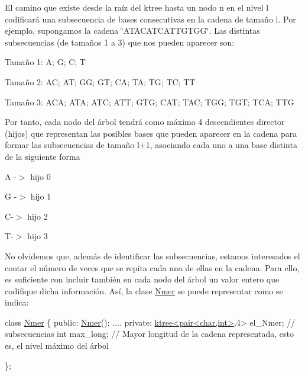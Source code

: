 El camino que existe desde la raíz del ktree hasta un nodo n en el nivel l codificará una subsecuencia de bases consecutivas en la cadena de tamaño l. Por ejemplo, supongamos la cadena \char`\"{}\+A\+T\+A\+C\+A\+T\+C\+A\+T\+T\+G\+T\+G\+G\char`\"{}. Las distintas subsecuencias (de tamaños 1 a 3) que nos pueden aparecer son\+:

\begin{DoxyItemize}
\item Tamaño 1\+: A; G; C; T \item Tamaño 2\+: AC; AT; GG; GT; CA; TA; TG; TC; TT \item Tamaño 3\+: A\+CA; A\+TA; A\+TC; A\+TT; G\+TG; C\+AT; T\+AC; T\+GG; T\+GT; T\+CA; T\+TG\end{DoxyItemize}
Por tanto, cada nodo del árbol tendrá como máximo 4 descendientes director (hijos) que representan las posibles bases que pueden aparecer en la cadena para formar las subsecuencias de tamaño l+1, asociando cada uno a una base distinta de la siguiente forma

\begin{DoxyItemize}
\item A -\/$>$ hijo 0\end{DoxyItemize}
\begin{DoxyItemize}
\item G -\/$>$ hijo 1\end{DoxyItemize}
\begin{DoxyItemize}
\item C-\/$>$ hijo 2\end{DoxyItemize}
\begin{DoxyItemize}
\item T-\/$>$ hijo 3\end{DoxyItemize}
No olvidemos que, además de identificar las subsecuencias, estamos interesados el contar el número de veces que se repita cada una de ellas en la cadena. Para ello, es suficiente con incluir también en cada nodo del árbol un valor entero que codifique dicha información. Así, la clase \hyperlink{classNmer}{Nmer} se puede representar como se indica\+:


\begin{DoxyCode}
\textcolor{keyword}{class }\hyperlink{classNmer}{Nmer} \{
  \textcolor{keyword}{public}:
    \hyperlink{classNmer_ac2a651dd05b03e716b877c26386d772e}{Nmer}();
    ....
  \textcolor{keyword}{private}:
    \hyperlink{classktree}{ktree<pair<char,int>},4> el\_Nmer; \textcolor{comment}{// subsecuencias }
    \textcolor{keywordtype}{int} max\_long; \textcolor{comment}{// Mayor longitud de la cadena representada, esto es, el nivel máximo del árbol}
  

\};
\end{DoxyCode}


